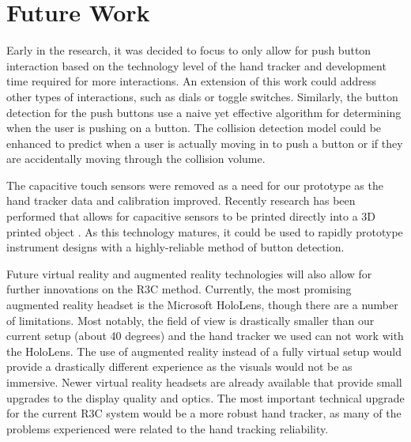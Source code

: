 \section{Future Work}

Early in the research, it was decided to focus to only allow for push button interaction based on the technology level of the hand tracker and development time required for more interactions.
An extension of this work could address other types of interactions, such as dials or toggle switches.
Similarly, the button detection for the push buttons use a naive yet effective algorithm for determining when the user is pushing on a button.
The collision detection model could be enhanced to predict when a user is actually moving in to push a button or if they are accidentally moving through the collision volume.

The capacitive touch sensors were removed as a need for our prototype as the hand tracker data and calibration improved.
Recently research has been performed that allows for capacitive sensors to be printed directly into a 3D printed object \citep{shemelya_3d_2013,kwok_electrically_2017}.
As this technology matures, it could be used to rapidly prototype instrument designs with a highly-reliable method of button detection.

Future virtual reality and augmented reality technologies will also allow for further innovations on the R3C method.
Currently, the most promising augmented reality headset is the Microsoft HoloLens, though there are a number of limitations.
Most notably, the field of view is drastically smaller than our current setup (about 40 degrees) and the hand tracker we used can not work with the HoloLens.
The use of augmented reality instead of a fully virtual setup would provide a drastically different experience as the visuals would not be as immersive.
Newer virtual reality headsets are already available that provide small upgrades to the display quality and optics.
The most important technical upgrade for the current R3C system would be a more robust hand tracker, as many of the problems experienced were related to the hand tracking reliability.

